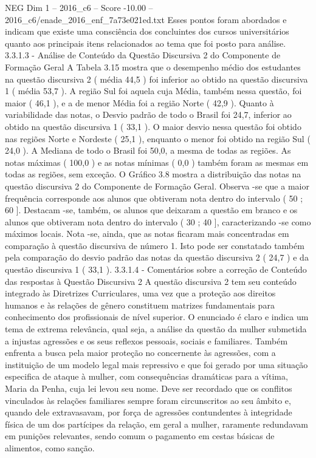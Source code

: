 \begin{textsample}{NEG Dim 1 – 2016\_c6 – Score -10.00 – 2016\_c6/enade\_2016\_enf\_7a73e021ed.txt}
Esses pontos foram abordados e indicam que existe uma consciência dos concluintes dos cursos universitários quanto aos principais itens relacionados ao tema que foi posto para análise. 3.3.1.3 - Análise de Conteúdo da Questão Discursiva 2 do Componente de Formação Geral A Tabela 3.15 mostra que o desempenho médio dos estudantes na questão discursiva 2 ( média 44,5 ) foi inferior ao obtido na questão discursiva 1 ( média 53,7 ).
A região Sul foi aquela cuja Média, também nessa questão, foi maior ( 46,1 ), e a de menor Média foi a região Norte ( 42,9 ).
Quanto à variabilidade das notas, o Desvio padrão de todo o Brasil foi 24,7, inferior ao obtido na questão discursiva 1 ( 33,1 ).
O maior desvio nessa questão foi obtido nas regiões Norte e Nordeste ( 25,1 ), enquanto o menor foi obtido na região Sul ( 24,0 ).
A Mediana de todo o Brasil foi 50,0, a mesma de todas as regiões.
As notas máximas ( 100,0 ) e as notas mínimas ( 0,0 ) também foram as mesmas em todas as regiões, sem exceção.
O Gráfico 3.8 mostra a distribuição das notas na questão discursiva 2 do Componente de Formação Geral.
Observa -se que a maior frequência corresponde aos alunos que obtiveram nota dentro do intervalo ( 50 ; 60 ].
Destacam -se, também, os alunos que deixaram a questão em branco e os alunos que obtiveram nota dentro do intervalo ( 30 ; 40 ], caracterizando -se como máximos locais.
Nota -se, ainda, que as notas ficaram mais concentradas em comparação à questão discursiva de número 1.
Isto pode ser constatado também pela comparação do desvio padrão das notas da questão discursiva 2 ( 24,7 ) e da questão discursiva 1 ( 33,1 ). 3.3.1.4 - Comentários sobre a correção de Conteúdo das respostas à Questão Discursiva 2 A questão discursiva 2 tem seu conteúdo integrado às Diretrizes Curriculares, uma vez que a proteção aos direitos humanos e às relações de gênero constituem matrizes fundamentais para conhecimento dos profissionais de nível superior.
O enunciado é claro e indica um tema de extrema relevância, qual seja, a análise da questão da mulher submetida a injustas agressões e os seus reflexos pessoais, sociais e familiares.
Também enfrenta a busca pela maior proteção no concernente às agressões, com a instituição de um modelo legal mais repressivo e que foi gerado por uma situação especifica de ataque à mulher, com consequências dramáticas para a vítima, Maria da Penha, cuja lei levou seu nome.
Deve ser recordado que os conflitos vinculados às relações familiares sempre foram circunscritos ao seu âmbito e, quando dele extravasavam, por força de agressões contundentes à integridade física de um dos partícipes da relação, em geral a mulher, raramente redundavam em punições relevantes, sendo comum o pagamento em cestas básicas de alimentos, como sanção.

\end{textsample}
